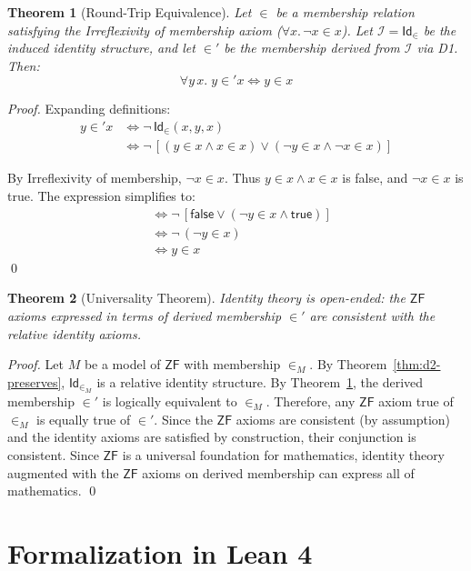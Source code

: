 \documentclass[11pt, a4paper]{article}
\newtheorem{theorem}{Theorem}[section]
\theoremstyle{remark}
\newcommand{\Id}{\mathsf{Id}}
\newcommand{\RI}{\mathcal{I}}
\newcommand{\ZF}{\mathsf{ZF}}
\begin{document}
\begin{theorem}[Round-Trip Equivalence]
\label{thm:roundtrip}
Let $\in$ be a membership relation satisfying the Irreflexivity of membership axiom ($\forall x.\, \neg x \in x$). Let $\RI = \Id_\in$ be the induced identity structure, and let $\in'$ be the membership derived from $\RI$ via D1. Then:
\[
\forall y\, x.\; y \in' x \iff y \in x
\]
\end{theorem}

\begin{proof}
Expanding definitions:
\begin{align*}
y \in' x &\iff \neg\, \Id_\in(x, y, x) \\
&\iff \neg\, [(y \in x \land x \in x) \lor (\neg y \in x \land \neg x \in x)]
\end{align*}

By Irreflexivity of membership, $\neg x \in x$. Thus $y \in x \land x \in x$ is false, and $\neg x \in x$ is true. The expression simplifies to:
\begin{align*}
&\iff \neg\, [\mathsf{false} \lor (\neg y \in x \land \mathsf{true})] \\
&\iff \neg\, (\neg y \in x) \\
&\iff y \in x
\end{align*}
\qed
\end{proof}

\begin{theorem}[Universality Theorem]
\label{thm:universality}
Identity theory is open-ended: the $\ZF$ axioms expressed in terms of derived membership $\in'$ are consistent with the relative identity axioms.
\end{theorem}

\begin{proof}
Let $M$ be a model of $\ZF$ with membership $\in_M$. By Theorem~\ref{thm:d2-preserves}, $\Id_{\in_M}$ is a relative identity structure. By Theorem~\ref{thm:roundtrip}, the derived membership $\in'$ is logically equivalent to $\in_M$. Therefore, any $\ZF$ axiom true of $\in_M$ is equally true of $\in'$. Since the $\ZF$ axioms are consistent (by assumption) and the identity axioms are satisfied by construction, their conjunction is consistent. Since $\ZF$ is a universal foundation for mathematics, identity theory augmented with the $\ZF$ axioms on derived membership can express all of mathematics.
\qed
\end{proof}

\section{Formalization in Lean 4}
\end{document}
